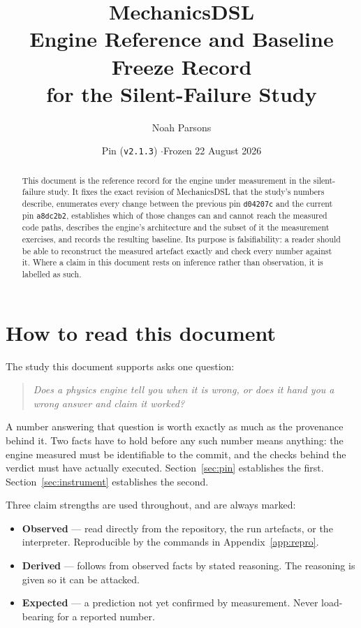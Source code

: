\documentclass[11pt,a4paper]{article}
\title{\textbf{MechanicsDSL}\\[0.4em]
       \large Engine Reference and Baseline Freeze Record\\[0.2em]
       \large for the Silent-Failure Study}
\author{Noah Parsons}
\date{Pin \gitsha{a8dc2b2} (\texttt{v2.1.3}) \quad$\cdot$\quad Frozen 22 August 2026}
\newcommand{\gitsha}[1]{\texttt{#1}}
\begin{document}
\maketitle

\begin{abstract}
\noindent
This document is the reference record for the engine under measurement in the
silent-failure study. It fixes the exact revision of MechanicsDSL that the
study's numbers describe, enumerates every change between the previous pin
\gitsha{d04207c} and the current pin \gitsha{a8dc2b2}, establishes which of
those changes can and cannot reach the measured code paths, describes the
engine's architecture and the subset of it the measurement exercises, and
records the resulting baseline. Its purpose is falsifiability: a reader should
be able to reconstruct the measured artefact exactly and check every number
against it. Where a claim in this document rests on inference rather than
observation, it is labelled as such.
\end{abstract}

\tableofcontents
\bigskip

\section{How to read this document}

The study this document supports asks one question:

\begin{quote}
\emph{Does a physics engine tell you when it is wrong, or does it hand you a
wrong answer and claim it worked?}
\end{quote}

A number answering that question is worth exactly as much as the provenance
behind it. Two facts have to hold before any such number means anything: the
engine measured must be identifiable to the commit, and the checks behind the
verdict must have actually executed. Section~\ref{sec:pin} establishes the
first. Section~\ref{sec:instrument} establishes the second.

Three claim strengths are used throughout, and are always marked:

\begin{itemize}[leftmargin=1.4em,itemsep=0.25em]
  \item \textbf{Observed} --- read directly from the repository, the run
        artefacts, or the interpreter. Reproducible by the commands in
        Appendix~\ref{app:repro}.
  \item \textbf{Derived} --- follows from observed facts by stated reasoning.
        The reasoning is given so it can be attacked.
  \item \textbf{Expected} --- a prediction not yet confirmed by measurement.
        Never load-bearing for a reported number.
\end{itemize}
\end{document}
